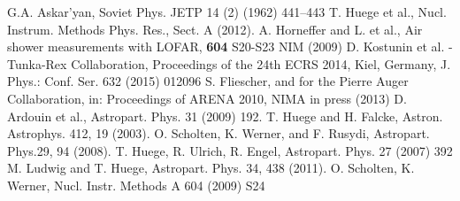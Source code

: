 \begin{thebibliography}{1}
 G.A. Askar’yan, Soviet Phys. JETP 14 (2) (1962) 441–443
 T. Huege et al., Nucl. Instrum. Methods Phys. Res., Sect.
A (2012).
 A. Horneffer and L. et al., Air shower measurements with LOFAR, \textbf{604} S20-S23 NIM (2009)
 D. Kostunin et al. - Tunka-Rex Collaboration, Proceedings of the 24th ECRS 2014, Kiel, Germany, J. Phys.: Conf. Ser. 632 (2015) 012096 
 S. Fliescher, and for the Pierre Auger Collaboration, in: Proceedings of ARENA 2010, NIMA in press (2013)
 D. Ardouin et al., Astropart. Phys. 31 (2009) 192.
 T. Huege and H. Falcke, Astron. Astrophys. 412, 19 (2003).
 O. Scholten, K. Werner, and F. Rusydi, Astropart. Phys.29, 94 (2008).
 T. Huege, R. Ulrich, R. Engel, Astropart. Phys. 27 (2007) 392
 M. Ludwig and T. Huege, Astropart. Phys. 34, 438 (2011).
 O. Scholten, K. Werner, Nucl. Instr. Methods A 604 (2009) S24
\end{thebibliography}